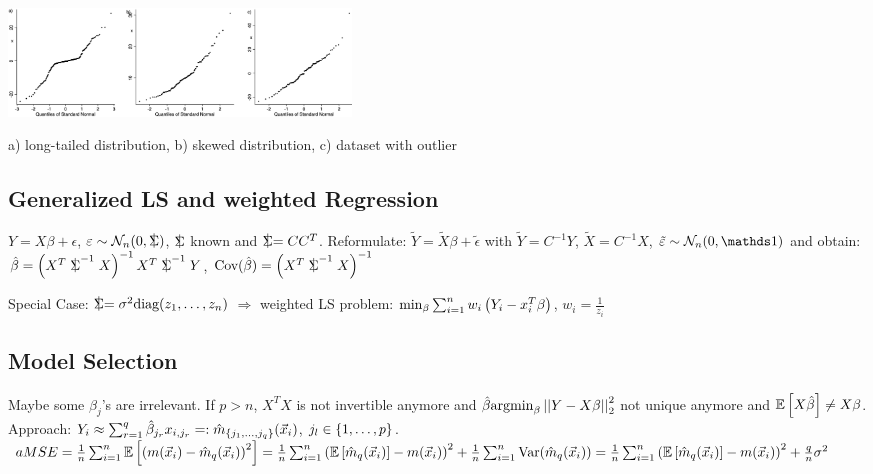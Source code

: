 \vspace{1pt}

\includegraphics[width=0.4\textwidth]{Bilder/QQPlot.png}

\vspace{1pt}

a) long-tailed distribution, b) skewed distribution, c) dataset with outlier

\subsection{Generalized LS and weighted Regression}
$Y = X \beta + \epsilon$, $\epsilon \sim \mathcal{N}_n(0,\SigmaCov)$, $\SigmaCov$ known and $\SigmaCov = C C^T$. Reformulate: $\tilde{Y} = \tilde{X} \beta + \tilde{\epsilon}$ with $\tilde{Y} = C^{-1} Y$, $\tilde{X} = C^{-1} X$, $\tilde{\epsilon} \sim \mathcal{N}_n (0,\id)$ and obtain: $\hat{\beta} = \klammer{X^T \SigmaCov^{-1} X}^{-1} X^T \SigmaCov^{-1} Y$, $\Cov(\hat{\beta}) = \klammer{X^T \SigmaCov^{-1} X}^{-1}$

\vspace{1pt}

Special Case: $\SigmaCov = \sigma^2 \text{diag}(z_1,\dots,z_n)$ $\Rightarrow$ weighted LS problem: $\min_\beta \sum_{i=1}^n w_i \left( Y_i - x_i^T \beta \right)$, $w_i = \frac{1}{z_i}$

\vspace{-5pt}

\subsection{Model Selection}
Maybe some $\beta_j$'s are irrelevant. If $p>n$, $X^T X$ is not invertible anymore and $\hat{\beta} \text{argmin}_\beta \left\vert\left\vert Y - X \beta \right\vert\right\vert_2^2$ not unique anymore and $\mathbb{E}\left[ X \hat{\beta} \right] \neq X \beta$. Approach: $Y_i \approx \sum_{r=1}^q \hat{\beta}_{j_r} x_{i,j_r} =: \hat{m}_{\left\{ j_1,\dots,j_q \right\}} (\vec{x}_i)$, $j_l \in \left\{ 1,\dots,p \right\}$. $aMSE = \frac{1}{n} \sum_{i=1}^{n} \mathbb{E} \left[ \left( m(\vec{x}_i) - \hat{m}_q (\vec{x}_i) \right)^2 \right] = \frac{1}{n} \sum_{i=1}^{n} \left( \mathbb{E} \left[ \hat{m}_q (\vec{x}_i) \right] - m(\vec{x}_i) \right)^2 + \frac{1}{n} \sum_{i=1}^{n} \text{Var}(\hat{m}_q (\vec{x}_i)) = \frac{1}{n} \sum_{i=1}^{n} \left( \mathbb{E} \left[ \hat{m}_q (\vec{x}_i) \right] - m(\vec{x}_i) \right)^2 + \frac{q}{n} \sigma^2$

